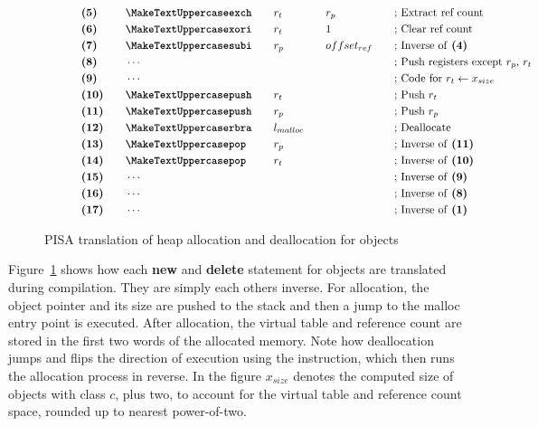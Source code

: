 \begin{figure}[ht]
\begin{subfigure}[t]{0.495\linewidth}
{\begin{minipage}{\linewidth}
\begin{alignat*}{5}
                    &\textbf{(5)}\quad&&\inst{exch}\quad && r_t\quad && r_p\quad &&\text{; Extract ref count}\\
                    &\textbf{(6)}\quad&&\inst{xori}\quad && r_t\quad && 1 &&\text{; Clear ref count}\\
                    &\textbf{(7)}\quad&&\inst{subi}\quad && r_p\quad && offset_{ref}\quad &&\text{; Inverse of \textbf{(4)}}\\
                    &\textbf{(8)}\quad&&\cdots \quad &&\quad && \quad &&\text{; Push registers except $r_p$, $r_t$ }\\
                    &\textbf{(9)}\quad&&\cdots\quad &&\quad && &&\text{; Code for $r_t \leftarrow x_{size}$}\\
                    &\textbf{(10)}\quad&&\inst{push}\quad && r_t \quad && &&\text{; Push $r_t$}\\
                    &\textbf{(11)}\quad&&\inst{push}\quad && r_p \quad && &&\text{; Push $r_p$}\\
                    &\textbf{(12)}\quad&&\inst{rbra}\quad && l_{malloc} \quad && &&\text{; Deallocate}\\
                    &\textbf{(13)}\quad&&\inst{pop}\quad && r_p \quad && &&\text{; Inverse of \textbf{(11)}}\\
                    &\textbf{(14)}\quad&&\inst{pop}\quad && r_t \quad && &&\text{; Inverse of \textbf{(10)}}\\
                    &\textbf{(15)}\quad&&\cdots\quad &&\quad && &&\text{; Inverse of \textbf{(9)}}\\
                    &\textbf{(16)}\quad&&\cdots\quad && \quad && &&\text{; Inverse of \textbf{(8)}}\\
                    &\textbf{(17)}\quad&&\cdots\quad && \quad && &&\text{; Inverse of \textbf{(1)}}\\
                \end{alignat*}
            \end{minipage}
        }
    \end{subfigure}
    \caption{PISA translation of heap allocation and deallocation for objects}
    \label{fig:pisa-allocation-deallocation}
\end{figure}

Figure~\ref{fig:pisa-allocation-deallocation} shows how each \textbf{new} and \textbf{delete} statement for objects are translated during compilation. They are simply each others inverse. For allocation, the object pointer and its size are pushed to the stack and then a jump to the malloc entry point is executed. After allocation, the virtual table and reference count are stored in the first two words of the allocated memory. Note how deallocation jumps and flips the direction of execution using the  instruction, which then runs the allocation process in reverse. In the figure $x_{size}$ denotes the computed size of objects with class $c$, plus two, to account for the virtual table and reference count space, rounded up to nearest power-of-two.


